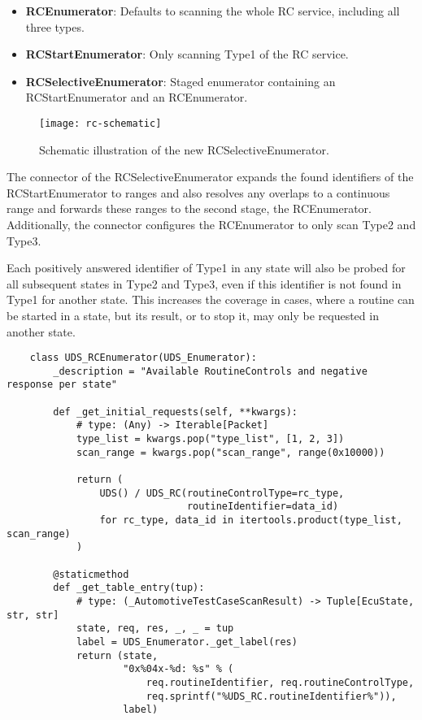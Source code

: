 \begin{itemize}
    \item \textbf{RCEnumerator}: Defaults to scanning the whole RC service, including all three types.
    \item \textbf{RCStartEnumerator}: Only scanning Type1 of the RC service.
    \item \textbf{RCSelectiveEnumerator}: Staged enumerator containing an RCStartEnumerator and an RCEnumerator.
\end{itemize}

\begin{figure}[h]
    \centering
    \texttt{[image: rc-schematic]}
    \caption{Schematic illustration of the new RCSelectiveEnumerator.}
    \label{fig:rc-schematic}
\end{figure}

The connector of the RCSelectiveEnumerator expands the found identifiers of the RCStartEnumerator to ranges and also resolves any overlaps to a continuous range and forwards these ranges to the second stage, the RCEnumerator. Additionally, the connector configures the RCEnumerator to only scan Type2 and Type3.

Each positively answered identifier of Type1 in any state will also be probed for all subsequent states in Type2 and Type3, even if this identifier is not found in Type1 for another state. This increases the coverage in cases, where a routine can be started in a state, but its result, or to stop it, may only be requested in another state.

\begin{verbatim}
    class UDS_RCEnumerator(UDS_Enumerator):
        _description = "Available RoutineControls and negative response per state"
    
        def _get_initial_requests(self, **kwargs):
            # type: (Any) -> Iterable[Packet]
            type_list = kwargs.pop("type_list", [1, 2, 3])
            scan_range = kwargs.pop("scan_range", range(0x10000))
    
            return (
                UDS() / UDS_RC(routineControlType=rc_type,
                               routineIdentifier=data_id)
                for rc_type, data_id in itertools.product(type_list, scan_range)
            )
    
        @staticmethod
        def _get_table_entry(tup):
            # type: (_AutomotiveTestCaseScanResult) -> Tuple[EcuState, str, str]
            state, req, res, _, _ = tup
            label = UDS_Enumerator._get_label(res)
            return (state,
                    "0x%04x-%d: %s" % (
                        req.routineIdentifier, req.routineControlType,
                        req.sprintf("%UDS_RC.routineIdentifier%")),
                    label)
\end{verbatim}

